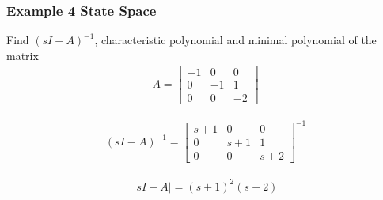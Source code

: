 \documentclass[11pt]{article}
\begin{document}
\subsubsection{Example 4 State Space}
Find $(s I - A)^{-1}$, characteristic polynomial and minimal polynomial of the matrix
\begin{align}
  A =
  \begin{bmatrix}
     -1 & 0 & 0 \\ 
     0 & -1 & 1 \\
     0 & 0 & -2
  \end{bmatrix}
\end{align}

\begin{align}
  (s I - A)^{-1} =
  \begin{bmatrix}
    s +1 & 0 & 0 \\
    0 & s + 1 & 1 \\ 
    0 & 0 & s + 2
  \end{bmatrix}^{-1}
\end{align}

\begin{align}
  |s I - A| = 
    (s+1)^2(s+2)
\end{align}
\end{document}
